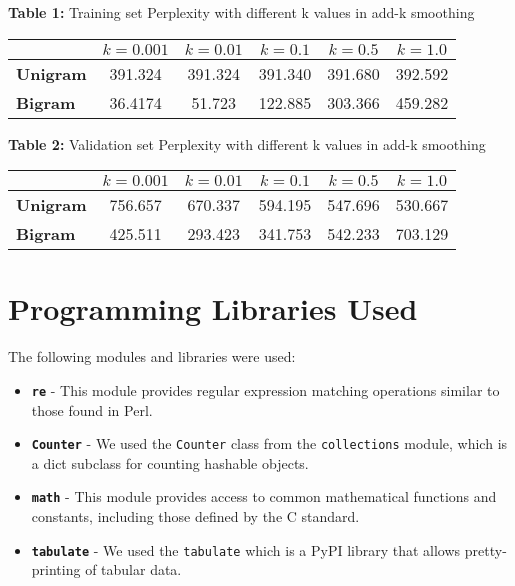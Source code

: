 \documentclass[a4paper]{article}
\begin{document}
{\centerline{\textbf{Table 1:} Training set Perplexity with different k values in add-k smoothing}
\begin{table}[ht]
\centering
\begin{tabular}{|l|c|c|c|c|c|}
\hline
\textbf{} & \textbf{$k=0.001$} & \textbf{$k=0.01$} & \textbf{$k=0.1$} & \textbf{$k=0.5$} & \textbf{$k=1.0$} \\
\hline
\textbf{Unigram} & 391.324 & 391.324 & 391.340 & 391.680 & 392.592 \\
\textbf{Bigram}  & 36.4174 & 51.723  & 122.885 & 303.366 & 459.282 \\
\hline
\end{tabular}
\end{table}

\vspace{1em}
\centerline{\textbf{Table 2:} Validation set Perplexity with different k values in add-k smoothing}
\begin{table}[ht]
\centering
\begin{tabular}{|l|c|c|c|c|c|}
\hline
\textbf{} & \textbf{$k=0.001$} & \textbf{$k=0.01$} & \textbf{$k=0.1$} & \textbf{$k=0.5$} & \textbf{$k=1.0$} \\
\hline
\textbf{Unigram} & 756.657 & 670.337 & 594.195 & 547.696 & 530.667 \\
\textbf{Bigram}  & 425.511 & 293.423 & 341.753 & 542.233 & 703.129 \\
\hline
\end{tabular}
\end{table}



\section{Programming Libraries Used}
The following modules and libraries were used:
\begin{itemize}
    \item \texttt{\textbf{re}} - This module provides regular expression matching operations similar to those found in Perl.
    \item \texttt{\textbf{Counter}} - We used the \texttt{Counter} class from the \texttt{collections} module, which is a dict subclass for counting hashable objects.
    \item \texttt{\textbf{math}} - This module provides access to common mathematical functions and constants, including those defined by the C standard.
    \item \texttt{\textbf{tabulate}} - We used the \texttt{tabulate} which is a PyPI library that allows pretty-printing of tabular data.
\end{itemize}


}
\end{document}
